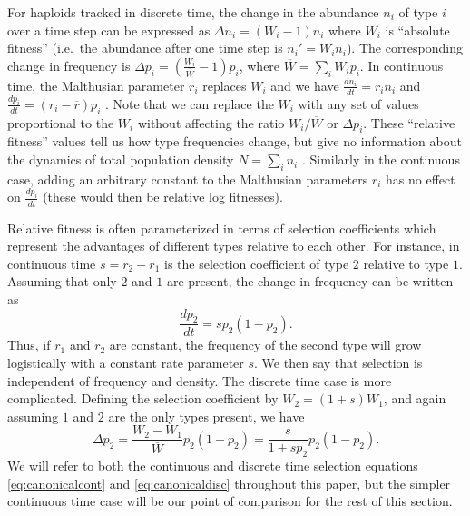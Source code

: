 \documentclass[12pt]{article}
\begin{document}
For haploids tracked in discrete time, the change in the abundance $n_i$ of type $i$ over a time step can be expressed as $\Delta n_i=(W_i - 1)n_i$ where $W_i$ is ``absolute fitness'' (i.e.~the abundance after one time step is $n_i'=W_i n_i$). The corresponding change in frequency is $\Delta p_i=\left(\frac{W_i}{\overline{W}}-1\right) p_i$, where $\overline{W}=\sum_i W_i p_i$. In continuous time, the Malthusian parameter $r_i$ replaces $W_i$ and we have $\frac{d n_i}{dt}=r_in_i$ and $\frac{d p_i}{dt}=(r_i-\overline{r}) p_i$ \citep{crow_1970}. Note that we can replace the $W_i$ with any set of values proportional to the $W_i$ without affecting the  ratio $W_i/\overline{W}$ or $\Delta p_i$. These ``relative fitness'' values tell us how type frequencies change, but give no information about the dynamics of total population density $N=\sum_i n_i$ \citep[pp. 468]{barton_2007}. Similarly in the continuous case, adding an arbitrary constant to the Malthusian parameters $r_i$ has no effect on $\frac{d p_i}{dt}$ (these would then be relative log fitnesses). 

Relative fitness is often parameterized in terms of selection coefficients which represent the advantages of different types relative to each other. For instance, in continuous time $s=r_2-r_1$ is the selection coefficient of type $2$ relative to type $1$. Assuming that only $2$ and $1$ are present, the change in frequency can be written as
\begin{equation}
\frac{d p_2}{dt}=s p_2 (1-p_2). \label{eq:canonicalcont}
\end{equation}
Thus, if $r_1$ and $r_2$ are constant, the frequency of the second type will grow logistically with a constant rate parameter $s$. We then say that selection is independent of frequency and density. The discrete time case is more complicated. Defining the selection coefficient by $W_2=(1+s)W_1$, and again assuming $1$ and $2$ are the only types present, we have  
\begin{equation}
\Delta p_2=\frac{W_2-W_1}{\overline{W}} p_2 (1-p_2)=\frac{s}{1+sp_2} p_2 (1-p_2). \label{eq:canonicaldisc}
\end{equation}
We will refer to both the continuous and discrete time selection equations \eqref{eq:canonicalcont} and \eqref{eq:canonicaldisc} throughout this paper, but the simpler continuous time case will be our point of comparison for the rest of this section.  
 
\end{document}
